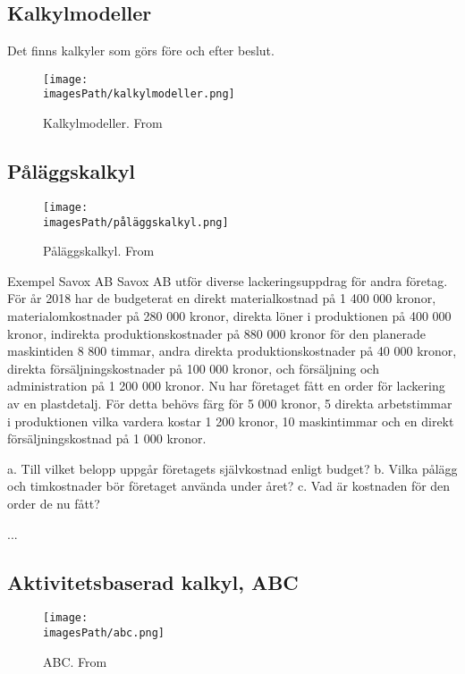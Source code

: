 \subsection{Kalkylmodeller}
Det finns kalkyler som görs före och efter beslut.
\begin{figure}[!ht]
    \centering
    \texttt{[image: \\imagesPath/kalkylmodeller.png]}
    \caption{Kalkylmodeller. From \cite{}}
\end{figure}


\newpage
\subsection{Påläggskalkyl}
\begin{figure}[!ht]
    \centering
    \texttt{[image: \\imagesPath/påläggskalkyl.png]}
    \caption{Påläggskalkyl. From \cite{}}
\end{figure}

\begin{exampleblock}{Exempel Savox AB}
   Savox AB utför diverse lackeringsuppdrag för andra företag. För år 2018 har de 
   budgeterat en direkt materialkostnad på 1 400 000 kronor, materialomkostnader på 
   280 000 kronor, direkta löner i produktionen på 400 000 kronor, indirekta produktionskostnader 
   på 880 000 kronor för den planerade maskintiden 8 800 timmar, andra direkta 
   produktionskostnader på 40 000 kronor, direkta försäljningskostnader på 100 000 kronor, 
   och försäljning och administration på 1 200 000 kronor. Nu har företaget fått en order för 
   lackering av en plastdetalj. För detta behövs färg för 5 000 kronor, 5 direkta 
   arbetstimmar i produktionen vilka vardera kostar 1 200 kronor, 10 maskintimmar och en 
   direkt försäljningskostnad på 1 000 kronor. 

   a. Till vilket belopp uppgår företagets självkostnad enligt budget?
   b. Vilka pålägg och timkostnader bör företaget använda under året? 
   c. Vad är kostnaden för den order de nu fått? 

   ... %
\end{exampleblock}

%
%
%

\newpage
\subsection{Aktivitetsbaserad kalkyl, ABC}
\begin{figure}[!ht]
    \centering
    \texttt{[image: \\imagesPath/abc.png]}
    \caption{ABC. From \cite{}}
\end{figure}


